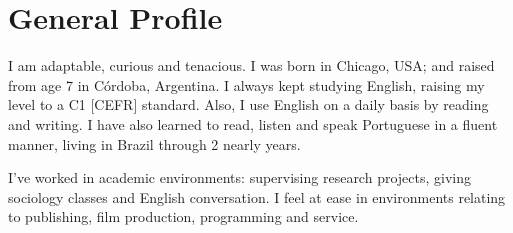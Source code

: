 
\makeprofile %

\vfill 


% 

\section{General Profile}

I am adaptable, curious and tenacious. I was born in Chicago, USA; and raised from age 7 in Córdoba, Argentina. 
%
I always kept studying English, raising my level to a C1 [CEFR] standard. 
Also, I use English on a daily basis by reading and writing. 
I have also learned to read, listen and speak Portuguese in a fluent manner, living in Brazil through 2 nearly years. 


I've worked in academic environments: supervising research projects, giving sociology classes and English conversation. %
I feel at ease in environments relating to publishing, film production, programming and service.

